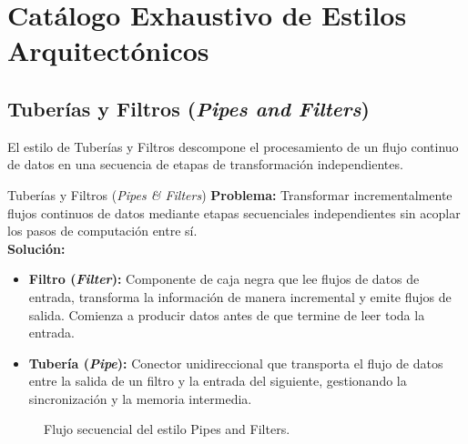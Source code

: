 \section{Catálogo Exhaustivo de Estilos Arquitectónicos}
\label{sec:catalogo-estilos}

\subsection{Tuberías y Filtros (\emph{Pipes and Filters})}

El estilo de Tuberías y Filtros descompone el procesamiento de un flujo continuo de datos en una secuencia de etapas de transformación independientes.

\begin{patronarquitectura}{Tuberías y Filtros (\emph{Pipes \& Filters})}
\textbf{Problema:} Transformar incrementalmente flujos continuos de datos mediante etapas secuenciales independientes sin acoplar los pasos de computación entre sí.\\
\textbf{Solución:}
\begin{itemize}[leftmargin=1.2em]
  \item \textbf{Filtro (\emph{Filter}):} Componente de caja negra que lee flujos de datos de entrada, transforma la información de manera incremental y emite flujos de salida. Comienza a producir datos antes de que termine de leer toda la entrada.
  \item \textbf{Tubería (\emph{Pipe}):} Conector unidireccional que transporta el flujo de datos entre la salida de un filtro y la entrada del siguiente, gestionando la sincronización y la memoria intermedia.
\end{itemize}
\end{patronarquitectura}

\begin{figure}[htbp]
\centering
{}
\caption{Flujo secuencial del estilo Pipes and Filters.}
\label{fig:pipe-filter}
\end{figure}


